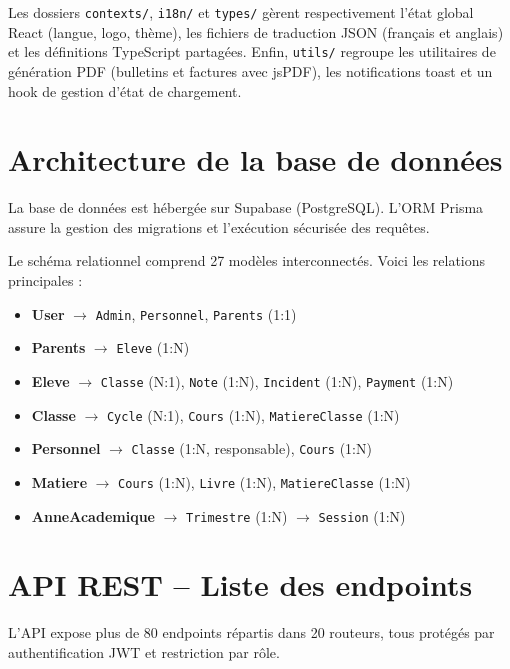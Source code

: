 \documentclass[12pt, a4paper]{report}
\begin{document}
Les dossiers \texttt{contexts/}, \texttt{i18n/} et \texttt{types/} gèrent respectivement l'état global React (langue, logo, thème), les fichiers de traduction JSON (français et anglais) et les définitions TypeScript partagées. Enfin, \texttt{utils/} regroupe les utilitaires de génération PDF (bulletins et factures avec jsPDF), les notifications toast et un hook de gestion d'état de chargement.

\section{Architecture de la base de données}

La base de données est hébergée sur Supabase (PostgreSQL). L'ORM Prisma assure la gestion des migrations et l'exécution sécurisée des requêtes.

Le schéma relationnel comprend 27 modèles interconnectés. Voici les relations principales :

\begin{itemize}[noitemsep]
    \item \textbf{User} $\rightarrow$ \texttt{Admin}, \texttt{Personnel}, \texttt{Parents} (1:1)
    \item \textbf{Parents} $\rightarrow$ \texttt{Eleve} (1:N)
    \item \textbf{Eleve} $\rightarrow$ \texttt{Classe} (N:1), \texttt{Note} (1:N), \texttt{Incident} (1:N), \texttt{Payment} (1:N)
    \item \textbf{Classe} $\rightarrow$ \texttt{Cycle} (N:1), \texttt{Cours} (1:N), \texttt{MatiereClasse} (1:N)
    \item \textbf{Personnel} $\rightarrow$ \texttt{Classe} (1:N, responsable), \texttt{Cours} (1:N)
    \item \textbf{Matiere} $\rightarrow$ \texttt{Cours} (1:N), \texttt{Livre} (1:N), \texttt{MatiereClasse} (1:N)
    \item \textbf{AnneAcademique} $\rightarrow$ \texttt{Trimestre} (1:N) $\rightarrow$ \texttt{Session} (1:N)
\end{itemize}

\section{API REST -- Liste des endpoints}

L'API expose plus de 80 endpoints répartis dans 20 routeurs, tous protégés par authentification JWT et restriction par rôle.
\end{document}
